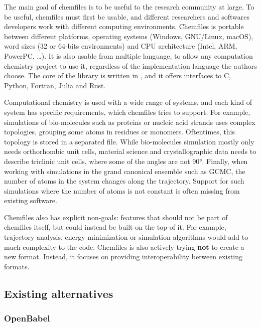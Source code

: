 \documentclass[thesis]{subfiles}
\begin{document}
The main goal of chemfiles is to be useful to the research community at large.
To be useful, chemfiles must first be usable, and different researchers and
softwares developers work with different computing environments. Chemfiles is
portable between different platforms, operating systems (Windows, GNU/Linux,
macOS), word sizes (32 or 64-bits environments) and CPU architecture (Intel,
ARM, PowerPC, \dots). It is also usable from multiple language, to allow any
computation chemistry project to use it, regardless of the implementation
language the authors choose. The core of the library is written in \cxx, and it
offers interfaces to C, Python, Fortran, Julia and Rust.

Computational chemistry is used with a wide range of systems, and each kind of
system has specific requirements, which chemfiles tries to support. For
example, simulations of bio-molecules such as proteins or nucleic acid strands
uses complex topologies, grouping some atoms in residues or monomers.
Oftentimes, this topology is stored in a separated file. While bio-molecules
simulation mostly only needs orthorhombic unit cells, material science and
crystallographic data needs to describe triclinic unit cells, where some of the
angles are not 90°. Finally, when working with simulations in the grand
canonical ensemble such as GCMC, the number of atoms in the system changes along
the trajectory. Support for such simulations where the number of atoms is not
constant is often missing from existing software.

Chemfiles also has explicit non-goals: features that should not be part of
chemfiles itself, but could instead be built on the top of it. For example,
trajectory analysis, energy minimization or simulation algorithms would add to
much complexity to the code. Chemfiles is also actively trying \textbf{not} to
create a new format. Instead, it focuses on providing interoperability between
existing formats.

\subsection{Existing alternatives}


\subsubsection{OpenBabel}
\end{document}
